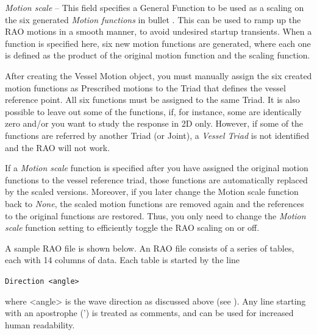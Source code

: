 \begin{bulletlist}

\item{\sl Motion scale} --
  This field specifies a General Function to be used as a scaling on the six
  generated {\sl Motion functions} in bullet .
  This can be used to ramp up the RAO motions in a smooth manner,
  to avoid undesired startup transients. When a function is specified here,
  six new motion functions are generated, where each one is defined as
  the product of the original motion function and the scaling function.
\end{bulletlist}

After creating the Vessel Motion object, you must manually assign the six
created motion functions as Prescribed motions to the Triad that defines the
vessel reference point. All six functions must be assigned to the same Triad.
It is also possible to leave out some of the functions, if, for instance,
some are identically zero and/or you want to study the response in 2D only.
However, if some of the functions are referred by another Triad (or Joint),
a {\sl Vessel Triad} is not identified and the RAO will not work.

If a {\sl Motion scale} function is specified after you have assigned the
original motion functions to the vessel reference triad, those functions are
automatically replaced by the scaled versions.
Moreover, if you later change the Motion scale function back to {\sl None},
the scaled motion functions are removed again and the references to the original
functions are restored. Thus, you only need to change the {\sl Motion scale}
function setting to efficiently toggle the RAO scaling on or off.



A sample RAO file is shown below. An RAO file consists of a series of tables,
each with 14 columns of data. Each table is started by the line

{\tt Direction \textless angle\textgreater}

\noindent where \textless angle\textgreater{} is the wave direction
as discussed above (see ).
Any line starting with an apostrophe (') is treated as comments,
and can be used for increased human readability.

